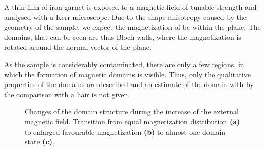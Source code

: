 \documentclass[a4paper]{scrartcl}
\numberwithin{equation}{section}
\numberwithin{figure}{section}
\numberwithin{table}{section}
\begin{document}
A thin film of iron-garnet is exposed to a magnetic field of tunable strength and analysed with a Kerr microscope. Due to the shape anisotropy caused by the geometry of the sample, we expect the magnetization of be within the plane. The domains, that can be seen are thus Bloch walls, where the magnetization is rotated around the normal vector of the plane. 

As the sample is considerably contaminated, there are only a few regions, in which the formation of magnetic domains is visible. Thus, only the qualitative properties of the domains are described and an estimate of the domain with by the comparison with a hair is not given.


\begin{figure} 
 \centering
{} \hfill
{} \hfill
{} \hfill
\caption{ Changes of the domain structure during the increase of the external magnetic field. Transition from equal magnetization distribution \textbf{(a)} to enlarged favourable magnetization \textbf{(b)} to almost one-domain state \textbf{(c)}.
\small  } 
	\label{fig:domains}
\end{figure}
\end{document}
